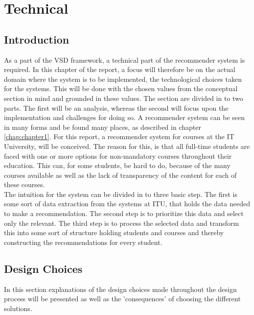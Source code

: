 
 
\section{Technical}



\subsection{Introduction}
As a part of the VSD framework, a technical part of the recommender system is required. In this chapter of the report, a focus will therefore be on the actual domain where the system is to be implemented, the technological choices taken for the systems. This will be done with the chosen values from the conceptual section in mind and grounded in these values. 
The section are divided in to two parts. The first will be an analysis, whereas the second will focus upon the implementation and challenges for doing so. 
A recommender system can be seen in many forms and be found many places, as described in chapter \ref{chap:chapter1}. For this report, a recommender system for courses at the IT University, will be conceived. The reason for this, is that all full-time students are faced with one or more options for non-mandatory courses throughout their education. This can, for some students, be hard to do, because of the many courses available as well as the lack of transparency of the content for each of these courses.\\

The intuition for the system can be divided in to three basic step. The first is some sort of data extraction from the systems at ITU, that holds the data needed to make a recommendation. The second step is to prioritize this data and select only the relevant. The third step is to process the selected data and transform this into some sort of structure holding students and courses and thereby constructing the recommendations for every student.

\subsection{Design Choices}
In this section explanations of the design choices made throughout the design process will be presented as well as the 'consequences' of choosing the different solutions. 
